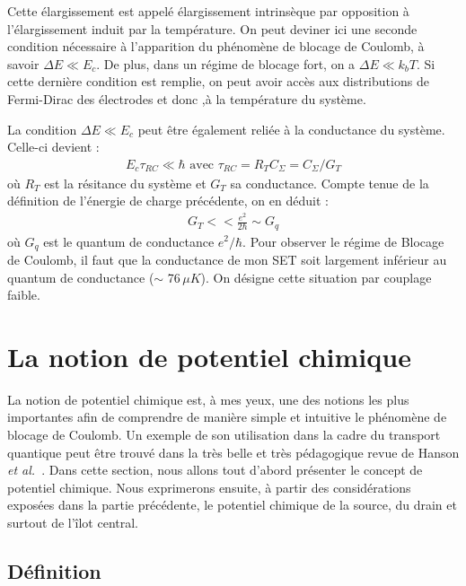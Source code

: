 Cette élargissement est appelé élargissement intrinsèque par opposition à l'élargissement induit par la température. On peut deviner ici une seconde condition nécessaire à l'apparition du phénomène de blocage de Coulomb, à savoir $\Delta E \ll E_c$. De plus, dans un régime de blocage fort, on a $\Delta E \ll k_bT$. Si cette dernière condition est remplie, on peut avoir accès aux distributions de Fermi-Dirac des électrodes et donc ,à la température du système.

La condition $\Delta E \ll E_c$ peut \^etre également reliée à la conductance du système. Celle-ci devient :
\begin{eqnarray}
E_c \tau_{RC} \ll \hbar \text{  avec  } \tau_{RC}=R_TC_{\Sigma}=C_{\Sigma}/G_T \nonumber
\end{eqnarray}
où $R_T$ est la résitance du système et $G_T$ sa conductance. Compte tenue de la définition de l'énergie de charge précédente, on en déduit :
\begin{eqnarray}
G_T << \frac{e^2}{2\hbar} \sim G_q
\end{eqnarray}
où $G_q$ est le quantum de conductance $e^2/ \hbar$. Pour observer le régime de Blocage de Coulomb, il faut que la conductance de mon SET soit largement inférieur au quantum de conductance ($\sim$ 76\,$\mu K$). On désigne cette situation par couplage faible.


\section{La notion de potentiel chimique}
La notion de potentiel chimique est, à mes yeux, une des notions les plus importantes afin de comprendre de manière simple et intuitive le phénomène de blocage de Coulomb. Un exemple de son utilisation dans la cadre du transport quantique peut \^etre trouvé dans la très belle et très pédagogique revue de Hanson \textit{et al.}~\cite{Hanson2007}. Dans cette section, nous allons tout d'abord présenter le concept de potentiel chimique. Nous exprimerons ensuite, à partir des considérations exposées dans la partie précédente, le potentiel chimique de la source, du drain et surtout de l'\^ilot central.

\subsection{Définition}


